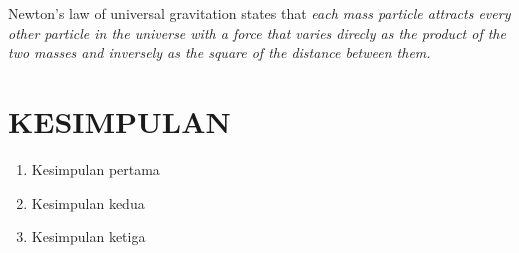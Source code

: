 \documentclass[11pt, a4paper]{article}
\begin{document}
Newton's law of universal gravitation states that \textit{each mass particle attracts every other particle in the universe with a force that varies direcly as the product of the two masses and inversely as the square of the distance between them.}~\autocite{book:classical}

\lipsum[1]
\section{KESIMPULAN}
\begin{enumerate}[topsep=0pt,itemsep=-1ex,partopsep=1ex,parsep=1ex, leftmargin=*]
    \item{%
            Kesimpulan pertama
        }
    \item{%
            Kesimpulan kedua
        }
    \item{%
            Kesimpulan ketiga
        }
\end{enumerate}
\printbibliography[title={REFERENSI}]
\end{document}
